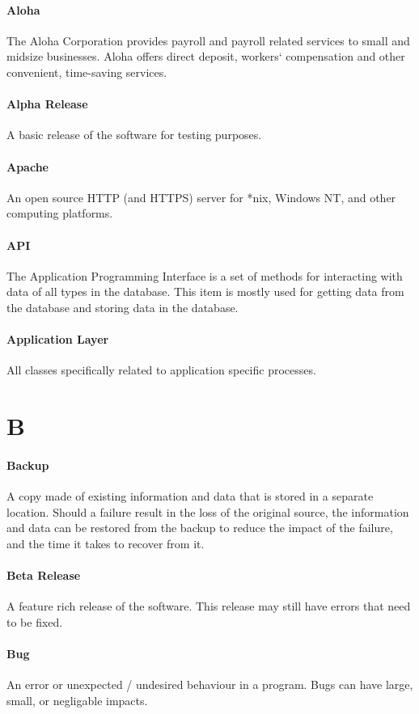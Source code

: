 \documentclass[letterpaper,12pt]{report}
\begin{document}
\paragraph{Aloha} The Aloha Corporation provides payroll and payroll related services to small and midsize businesses. Aloha offers direct deposit, workers` compensation and other convenient, time-saving services.
\paragraph{Alpha Release} A basic release of the software for testing purposes.
\paragraph{Apache} An open source HTTP (and HTTPS) server for *nix, Windows NT, and other computing platforms.
\paragraph{API} The Application Programming Interface is a set of methods for interacting with data of all types in the database. This item is mostly used for getting data from the database and storing data in the database.
\paragraph{Application Layer} All classes specifically related to application specific processes.
\section*{B}
\paragraph{Backup} A copy made of existing information and data that is stored in a separate location. Should a failure result in the loss of the original source, the information and data can be restored from the backup to reduce the impact of the failure, and the time it takes to recover from it.
\paragraph{Beta Release} A feature rich release of the software. This release may still have errors that need to be fixed.
\paragraph{Bug} An error or unexpected / undesired behaviour in a program. Bugs can have large, small, or negligable impacts.
\end{document}
